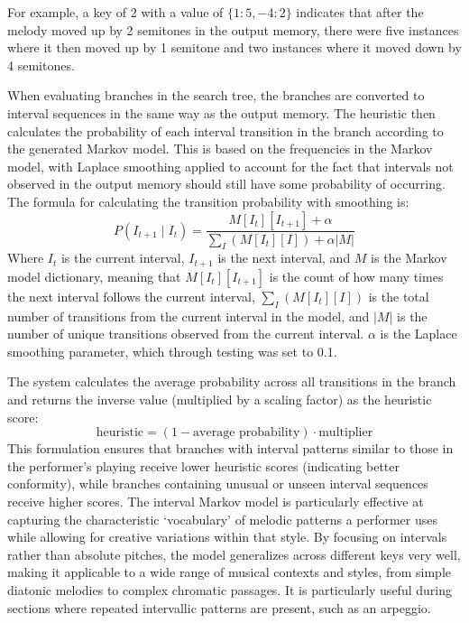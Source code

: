 For example, a key of 2 with a value of $\{1: 5, -4: 2\}$ indicates that after the melody moved up by 2 semitones in the output memory, there were five instances where it then moved up by 1 semitone and two instances where it moved down by 4 semitones.

When evaluating branches in the search tree, the branches are converted to interval sequences in the same way as the output memory. The heuristic then calculates the probability of each interval transition in the branch according to the generated Markov model. This is based on the frequencies in the Markov model, with Laplace smoothing applied to account for the fact that intervals not observed in the output memory should still have some probability of occurring. The formula for calculating the transition probability with smoothing is:
\begin{equation}
    P( I_{t+1} \mid I_t ) = \frac{M[I_t][I_{t+1}] + \alpha}{\sum_{I}(M[I_t][I]) + \alpha\left|M\right|}
\end{equation}
Where $I_{t}$ is the current interval, $I_{t+1}$ is the next interval, and $M$ is the Markov model dictionary, meaning that $M[I_t][I_{t+1}]$ is the count of how many times the next interval follows the current interval, $\sum_{I}(M[I_t][I])$ is the total number of transitions from the current interval in the model, and $\left|M\right|$ is the number of unique transitions observed from the current interval. $\alpha$ is the Laplace smoothing parameter, which through testing was set to 0.1.

The system calculates the average probability across all transitions in the branch and returns the inverse value (multiplied by a scaling factor) as the heuristic score:
\begin{equation}
    \text{heuristic} = (1 - \text{average probability}) \cdot \text{multiplier}
\end{equation}
This formulation ensures that branches with interval patterns similar to those in the performer's playing receive lower heuristic scores (indicating better conformity), while branches containing unusual or unseen interval sequences receive higher scores.
The interval Markov model is particularly effective at capturing the characteristic `vocabulary' of melodic patterns a performer uses while allowing for creative variations within that style. By focusing on intervals rather than absolute pitches, the model generalizes across different keys very well, making it applicable to a wide range of musical contexts and styles, from simple diatonic melodies to complex chromatic passages. It is particularly useful during sections where repeated intervallic patterns are present, such as an arpeggio.

